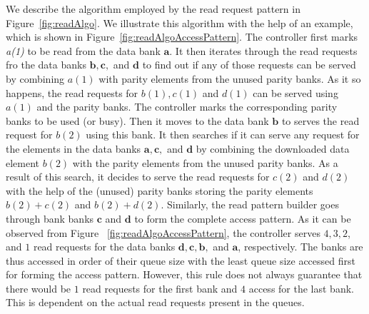  We describe the algorithm employed by the read request pattern in Figure~\ref{fig:readAlgo}. We illustrate this algorithm with the help of an example, which is shown in Figure~\ref{fig:readAlgoAccessPattern}. %
The controller first marks {\em a(1)} to be read from the data bank $\mathbf{a}$. It then iterates through the read requests fro the data banks $\mathbf{b}, \mathbf{c},$ and $\mathbf{d}$ to find out if any of those requests can be served by combining $a(1)$ with parity elements from the unused parity banks. As it so happens, the read requests for $b(1), c(1)$ and $d(1)$ can be served using $a(1)$ and the parity banks. The controller marks the corresponding parity banks to be used (or busy). Then it moves to the data bank $\mathbf{b}$ to serves the read request for $b(2)$ using this bank. It then searches if it can serve any request for the elements in the data banks $\mathbf{a}, \mathbf{c},$ and  $\mathbf{d}$ by combining the downloaded data element $b(2)$ with the parity elements from the unused parity banks. As a result of this search, it decides to serve the read requests for $c(2)$ and $d(2)$ with the help of the (unused) parity banks storing the parity elements $b(2) + c(2)$ and $b(2) + d(2)$. Similarly, the read pattern builder goes through bank banks $\mathbf{c}$ and $\mathbf{d}$ to form the complete access pattern. As it can be observed from Figure ~\ref{fig:readAlgoAccessPattern}, the controller 
serves $4, 3, 2$, and  $1$ read requests for the data banks $\mathbf{d}, \mathbf{c}, \mathbf{b},$ and $\mathbf{a}$, respectively. The banks are thus 
accessed in order of their queue size with the least queue size accessed first 
for forming the access pattern. However, this rule does not always guarantee that 
there would be $1$ read requests for the first bank and $4$ access for the last bank. This 
is dependent on the actual read requests present in the queues. 

